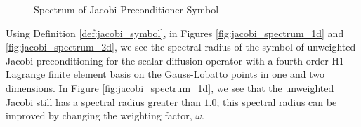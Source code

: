 \begin{figure}[!ht]
  \centering
  \hfill
  \caption{Spectrum of Jacobi Preconditioner Symbol}
\end{figure}

Using Definition \ref{def:jacobi_symbol}, in Figures \ref{fig:jacobi_spectrum_1d} and \ref{fig:jacobi_spectrum_2d}, we see the spectral radius of the symbol of unweighted Jacobi preconditioning for the scalar diffusion operator with a fourth-order H1 Lagrange finite element basis on the Gauss-Lobatto points in one and two dimensions.
In Figure \ref{fig:jacobi_spectrum_1d}, we see that the unweighted Jacobi still has a spectral radius greater than $1.0$; this spectral radius can be improved by changing the weighting factor, $\omega$.

